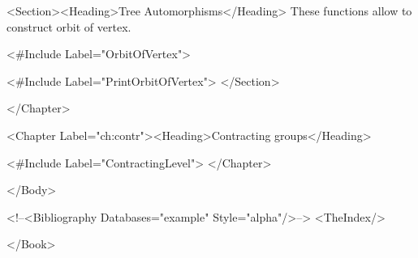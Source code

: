  <Section><Heading>Tree Automorphisms</Heading>
 These functions allow to construct orbit of vertex.

 <#Include Label="OrbitOfVertex">

 <#Include Label="PrintOrbitOfVertex">
 </Section>

</Chapter>


<Chapter Label="ch:contr"><Heading>Contracting groups</Heading>

 <#Include Label="ContractingLevel">
</Chapter>

</Body>


<!--<Bibliography Databases="example" Style="alpha"/>-->
<TheIndex/>

</Book>

